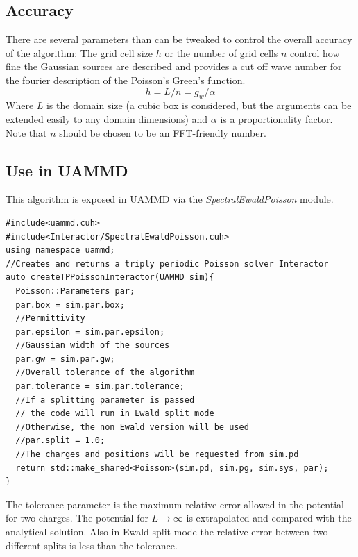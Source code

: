 \documentclass[ twoside,openright,titlepage,numbers=noenddot,%
headinclude,footinclude,cleardoublepage=empty,abstract=on,
BCOR=5mm,paper=a4,fontsize=11pt, dvipsnames
]{scrreprt}
\def\ucpp{uammd_cpp_lexer.py:UAMMDCppLexer -x}
\newcommand{\uammd}{\gls{UAMMD}\xspace}
\begin{document}
\subsection*{Accuracy}
There are several parameters than can be tweaked to control the overall accuracy of the algorithm:
The grid cell size $h$ or the number of grid cells $n$ control how fine the Gaussian sources are described and provides a cut off wave number for the fourier description of the Poisson's Green's function.
\begin{equation}
h = L/n = g_w/\alpha
\end{equation}
Where $L$ is the domain size (a cubic box is considered, but the arguments can be extended easily to any domain dimensions) and $\alpha$ is a proportionality factor. Note that $n$ should be chosen to be an \gls{FFT}-friendly number.


\subsection*{Use in UAMMD}

This algorithm is exposed in \uammd via the \emph{SpectralEwaldPoisson} module.

\begin{verbatim}
#include<uammd.cuh>
#include<Interactor/SpectralEwaldPoisson.cuh>
using namespace uammd;
//Creates and returns a triply periodic Poisson solver Interactor
auto createTPPoissonInteractor(UAMMD sim){
  Poisson::Parameters par;
  par.box = sim.par.box;
  //Permittivity
  par.epsilon = sim.par.epsilon;
  //Gaussian width of the sources
  par.gw = sim.par.gw; 
  //Overall tolerance of the algorithm
  par.tolerance = sim.par.tolerance;
  //If a splitting parameter is passed
  // the code will run in Ewald split mode
  //Otherwise, the non Ewald version will be used
  //par.split = 1.0;
  //The charges and positions will be requested from sim.pd
  return std::make_shared<Poisson>(sim.pd, sim.pg, sim.sys, par);
}
\end{verbatim}
The tolerance parameter is the maximum relative error allowed in the potential for two charges. The potential for $L\rightarrow\infty$ is extrapolated and compared with the analytical solution. Also in Ewald split mode the relative error between two different splits is less than the tolerance.
\end{document}
